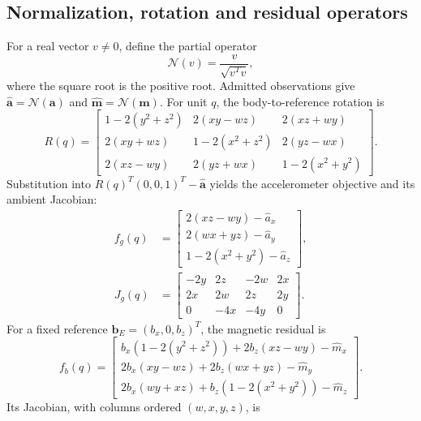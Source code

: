 \subsection{Normalization, rotation and residual operators}
For a real vector $v\ne0$, define the partial operator
\[
\mathcal N(v)=\frac{v}{\sqrt{v^Tv}},
\]
where the square root is the positive root. Admitted observations give
$\widehat{\boldsymbol a}=\mathcal N(\boldsymbol a)$ and
$\widehat{\boldsymbol m}=\mathcal N(\boldsymbol m)$.
For unit $q$, the body-to-reference rotation is
\[
R(q)=\begin{bmatrix}
1-2(y^2+z^2)&2(xy-wz)&2(xz+wy)\\
2(xy+wz)&1-2(x^2+z^2)&2(yz-wx)\\
2(xz-wy)&2(yz+wx)&1-2(x^2+y^2)
\end{bmatrix}.
\]
Substitution into $R(q)^T(0,0,1)^T-\widehat{\boldsymbol a}$ yields the
accelerometer objective and its ambient Jacobian:
\begin{align}
f_g(q)&=\begin{bmatrix}
2(xz-wy)-\widehat a_x\\2(wx+yz)-\widehat a_y\\
1-2(x^2+y^2)-\widehat a_z
\end{bmatrix},\label{eq:mad-fg}\\
J_g(q)&=\begin{bmatrix}
-2y&2z&-2w&2x\\2x&2w&2z&2y\\0&-4x&-4y&0
\end{bmatrix}.\label{eq:mad-jg}
\end{align}
For a fixed reference $\boldsymbol b_E=(b_x,0,b_z)^T$, the magnetic residual is
\begin{equation}
f_b(q)=\begin{bmatrix}
b_x(1-2(y^2+z^2))+2b_z(xz-wy)-\widehat m_x\\
2b_x(xy-wz)+2b_z(wx+yz)-\widehat m_y\\
2b_x(wy+xz)+b_z(1-2(x^2+y^2))-\widehat m_z
\end{bmatrix}.
\label{eq:mad-fb}
\end{equation}
Its Jacobian, with columns ordered $(w,x,y,z)$, is
